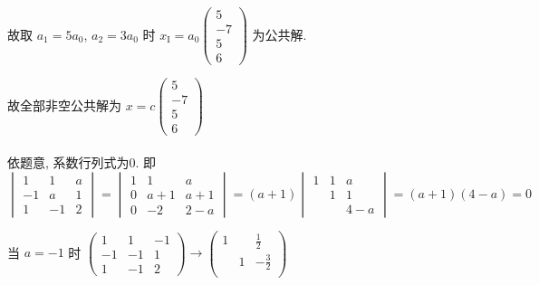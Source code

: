 \begin{enumerate}
                   故取 \( a_{1} = 5a_{0} \), \( a_{2} = 3a_{0} \) 时 \( x_{\text{I}} = a_{0}\begin{pmatrix}
                       5  \\
                       -7 \\
                       5  \\
                       6
                   \end{pmatrix} \) 为公共解.

                   故全部非空公共解为 \( x = c\begin{pmatrix}
                       5  \\
                       -7 \\
                       5  \\
                       6
                   \end{pmatrix} \)
         \end{enumerate}


     \paragraph{} %
         依题意, 系数行列式为0. 即
         \[ \begin{vmatrix}
                 1  & 1  & a \\
                 -1 & a  & 1 \\
                 1  & -1 & 2
             \end{vmatrix} = \begin{vmatrix}
                 1 & 1   & a   \\
                 0 & a+1 & a+1 \\
                 0 & -2  & 2-a
             \end{vmatrix} = (a+1)\begin{vmatrix}
                 1 & 1 & a   \\
                   & 1 & 1   \\
                   &   & 4-a
             \end{vmatrix} = (a+1)(4-a) = 0 \]

         当 \( a = -1 \) 时 \( \begin{pmatrix}
             1  & 1  & -1 \\
             -1 & -1 & 1  \\
             1  & -1 & 2
         \end{pmatrix} \rightarrow \begin{pmatrix}
             1 &   & \frac{1}{2}  \\
               & 1 & -\frac{3}{2} \\
               &   &
         \end{pmatrix} \)

